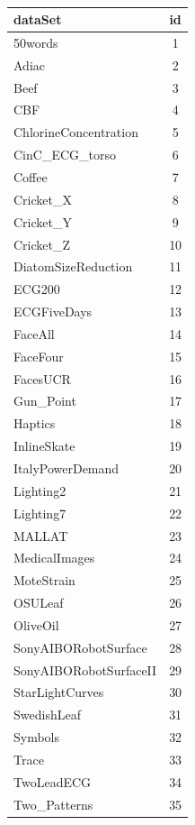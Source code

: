 \documentclass[12pt,a4paper,fleqn]{tufte-handout}
\begin{document}
 
\begin{table}       
\begin{center}       
\       
\setlength{\tabcolsep}{.16667em}       
\begin{tabular}{lc}       
dataSet & id \\       
\hline       
50words &  1 \\       
Adiac &  2 \\       
Beef &  3 \\       
CBF &  4 \\       
ChlorineConcentration &  5 \\       
CinC\_ECG\_torso &  6 \\       
Coffee &  7 \\       
Cricket\_X &  8 \\       
Cricket\_Y &  9 \\       
Cricket\_Z & 10 \\       
DiatomSizeReduction & 11 \\       
ECG200 & 12 \\       
ECGFiveDays & 13 \\       
FaceAll & 14 \\       
FaceFour & 15 \\       
FacesUCR & 16 \\       
Gun\_Point & 17 \\       
Haptics & 18 \\       
InlineSkate & 19 \\       
ItalyPowerDemand & 20 \\       
Lighting2 & 21 \\       
Lighting7 & 22 \\       
MALLAT & 23 \\       
MedicalImages & 24 \\       
MoteStrain & 25 \\       
OSULeaf & 26 \\       
OliveOil & 27 \\       
SonyAIBORobotSurface & 28 \\       
SonyAIBORobotSurfaceII & 29 \\       
StarLightCurves & 30 \\       
SwedishLeaf & 31 \\       
Symbols & 32 \\       
Trace & 33 \\       
TwoLeadECG & 34 \\       
Two\_Patterns & 35 \\       

\end{tabular}
\end{center}
\end{table}
\end{document}
